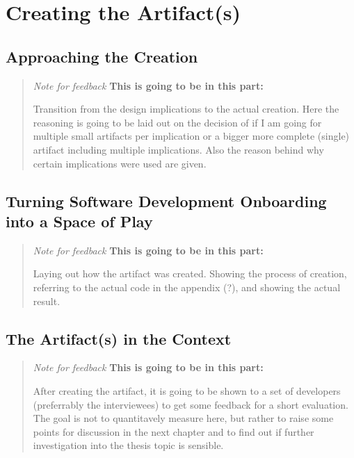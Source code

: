 \section{Creating the Artifact(s)}

\subsection{Approaching the Creation}

\blockquote{
\textit{Note for feedback}
\textbf{This is going to be in this part:}

Transition from the design implications to the actual creation. Here the reasoning is going to be laid out on the decision of if I am going for multiple small artifacts per implication or a bigger more complete (single) artifact including multiple implications. Also the reason behind why certain implications were used are given.

}

\subsection{Turning Software Development Onboarding into a Space of Play}

\blockquote{
\textit{Note for feedback}
\textbf{This is going to be in this part:}

Laying out how the artifact was created. Showing the process of creation, referring to the actual code in the appendix (?), and showing the actual result.

}

\subsection{The Artifact(s) in the Context}

\blockquote{
\textit{Note for feedback}
\textbf{This is going to be in this part:}

After creating the artifact, it is going to be shown to a set of developers (preferrably the interviewees) to get some feedback for a short evaluation. The goal is not to quantitavely measure here, but rather to raise some points for discussion in the next chapter and to find out if further investigation into the thesis topic is sensible.

}